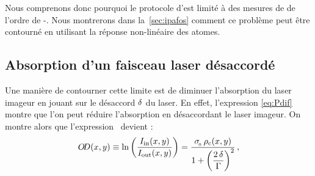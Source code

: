 Nous comprenons donc pourquoi le protocole d'\ipafas est limité à des mesures de \pro de l'ordre de -.
Nous montrerons dans la~\autoref{sec:ipafos} comment ce problème peut être contourné en utilisant la réponse non-linéaire des atomes.

\subsection{Absorption d'un faisceau laser désaccordé}\label{sec:ImagerieDesaccordee}
Une manière de contourner cette limite est de diminuer l'absorption du laser imageur en jouant sur le désaccord ${\delta}$ du laser. En effet, l'expression \vref{eq:Pdif} montre que l'on peut réduire l'absorption en désaccordant le laser imageur. On montre alors que l'expression~ devient :
\begin{equation}
	\OptDens\xy 
	\equiv 	\Ln{	\frac{\Iinxy}{\Ioutxy}	}
	= \frac{\seceff\,\denscolxy}{1+\left(\dfrac{2\,\desac}{\pulsSpont}\right)^2} 
\virguleformule
	\label{eq:ODhorsReso}
\end{equation}

